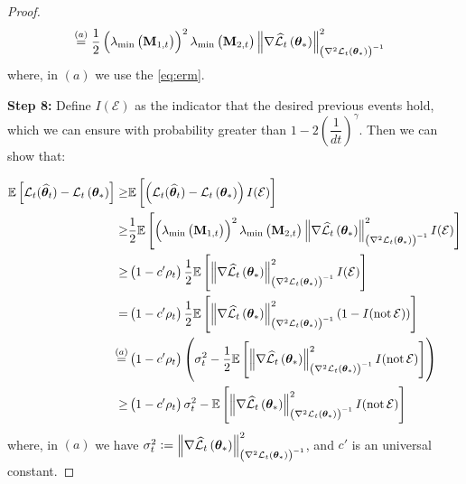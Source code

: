 \begin{proof}
\begin{align*}
&\overset{(a)}{=}\frac{1}{2}\left(\lambda_{\min }\left(\mathbf{M}_{1, t}\right)\right)^{2} \lambda_{\min }\left(\mathbf{M}_{2, t}\right)\left\|\nabla \widehat{\cal L}_{t}\left(\bm{\theta}_{*}\right)\right\|_{\left(\nabla^{2} {\cal L}_{t}\left(\bm{\theta}_{*}\right)\right)^{-1}}^{2}
\end{align*}
where, in $(a)$ we use the \cref{eq:erm}.

\textbf{Step 8:} Define $I(\mathcal{E})$ as the indicator that the desired previous events hold, which we can ensure with probability greater than $1-2\left(\dfrac{1}{dt}\right)^{\gamma}$. Then we can show that:

\begin{align*}
 \mathbb{E}\left[{\cal L}_{t}({\widehat{\bm{\theta}}}_{t})-{\cal L}_{t}\left(\bm{\theta}_{*}\right)\right] 
\geq & \mathbb{E}\left[\left({\cal L}_{t}({\widehat{\bm{\theta}}}_{t})-{\cal L}_{t}\left(\bm{\theta}_{*}\right)\right) I(\mathcal{E})\right] \\
\geq & \frac{1}{2} \mathbb{E}\left[\left(\lambda_{\min }\left(\mathbf{M}_{1, t}\right)\right)^{2} \lambda_{\min }\left(\mathbf{M}_{2, t}\right)\left\|\nabla \widehat{\cal L}_{t}\left(\bm{\theta}_{*}\right)\right\|_{\left(\nabla^{2} {\cal L}_{t}\left(\bm{\theta}_{*}\right)\right)^{-1}}^{2} I(\mathcal{E})\right] \\
\geq &\left(1-c^{\prime} \rho_t\right) \frac{1}{2} \mathbb{E}\left[\left\|\nabla \widehat{\cal L}_{t}\left(\bm{\theta}_{*}\right)\right\|_{\left(\nabla^{2} {\cal L}_{t}\left(\bm{\theta}_{*}\right)\right)^{-1}}^{2} I(\mathcal{E})\right] \\
=&\left(1-c^{\prime} \rho_t\right) \frac{1}{2} \mathbb{E}\left[\left\|\nabla \widehat{\cal L}_{t}\left(\bm{\theta}_{*}\right)\right\|_{\left(\nabla^{2} {\cal L}_{t}\left(\bm{\theta}_{*}\right)\right)^{-1}}^{2}(1-I(\operatorname{not} \mathcal{E}))\right] \\
\overset{(a)}{=}&\left(1-c^{\prime} \rho_t\right)\left(\sigma^{2}_t-\frac{1}{2} \mathbb{E}\left[\left\|\nabla \widehat{\cal L}_{t}\left(\bm{\theta}_{*}\right)\right\|_{\left(\nabla^{2} {\cal L}_{t}\left(\bm{\theta}_{*}\right)\right)^{-1}}^{2} I(\operatorname{not} \mathcal{E})\right]\right) \\
\geq &\left(1-c^{\prime} \rho_t\right) \sigma^{2}_t-\mathbb{E}\left[\left\|\nabla \widehat{\cal L}_{t}\left(\bm{\theta}_{*}\right)\right\|_{\left(\nabla^{2} {\cal L}_{t}\left(\bm{\theta}_{*}\right)\right)^{-1}}^{2} I(\operatorname{not} \mathcal{E})\right]
\end{align*}
where, in $(a)$ we have $\sigma^2_t:= \left\|\nabla \widehat{\cal L}_{t}\left(\bm{\theta}_{*}\right)\right\|_{\left(\nabla^{2} {\cal L}_{t}\left(\bm{\theta}_{*}\right)\right)^{-1}}^{2}$, and $c'$ is an universal constant.


\end{proof}
